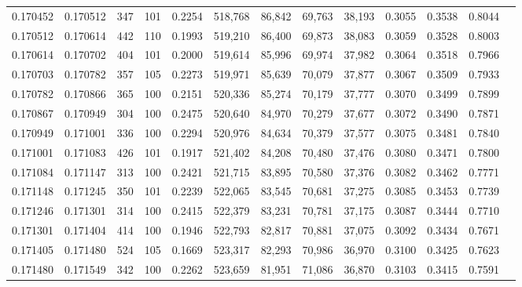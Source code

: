 \begin{tabular}{rrrrrrrrrrrrr}
0.170452 & 0.170512 &   347 & 101 &                                     0.2254 & 518,768 &  86,842 &  69,763 &  38,193 & 0.3055 & 0.3538 & 0.8044 \\
0.170512 & 0.170614 &   442 & 110 &                                     0.1993 & 519,210 &  86,400 &  69,873 &  38,083 & 0.3059 & 0.3528 & 0.8003 \\
0.170614 & 0.170702 &   404 & 101 &                                     0.2000 & 519,614 &  85,996 &  69,974 &  37,982 & 0.3064 & 0.3518 & 0.7966 \\
0.170703 & 0.170782 &   357 & 105 &                                     0.2273 & 519,971 &  85,639 &  70,079 &  37,877 & 0.3067 & 0.3509 & 0.7933 \\
0.170782 & 0.170866 &   365 & 100 &                                     0.2151 & 520,336 &  85,274 &  70,179 &  37,777 & 0.3070 & 0.3499 & 0.7899 \\
0.170867 & 0.170949 &   304 & 100 &                                     0.2475 & 520,640 &  84,970 &  70,279 &  37,677 & 0.3072 & 0.3490 & 0.7871 \\
0.170949 & 0.171001 &   336 & 100 &                                     0.2294 & 520,976 &  84,634 &  70,379 &  37,577 & 0.3075 & 0.3481 & 0.7840 \\
0.171001 & 0.171083 &   426 & 101 &                                     0.1917 & 521,402 &  84,208 &  70,480 &  37,476 & 0.3080 & 0.3471 & 0.7800 \\
0.171084 & 0.171147 &   313 & 100 &                                     0.2421 & 521,715 &  83,895 &  70,580 &  37,376 & 0.3082 & 0.3462 & 0.7771 \\
0.171148 & 0.171245 &   350 & 101 &                                     0.2239 & 522,065 &  83,545 &  70,681 &  37,275 & 0.3085 & 0.3453 & 0.7739 \\
0.171246 & 0.171301 &   314 & 100 &                                     0.2415 & 522,379 &  83,231 &  70,781 &  37,175 & 0.3087 & 0.3444 & 0.7710 \\
0.171301 & 0.171404 &   414 & 100 &                                     0.1946 & 522,793 &  82,817 &  70,881 &  37,075 & 0.3092 & 0.3434 & 0.7671 \\
0.171405 & 0.171480 &   524 & 105 &                                     0.1669 & 523,317 &  82,293 &  70,986 &  36,970 & 0.3100 & 0.3425 & 0.7623 \\
0.171480 & 0.171549 &   342 & 100 &                                     0.2262 & 523,659 &  81,951 &  71,086 &  36,870 & 0.3103 & 0.3415 & 0.7591 \\

\end{tabular}
